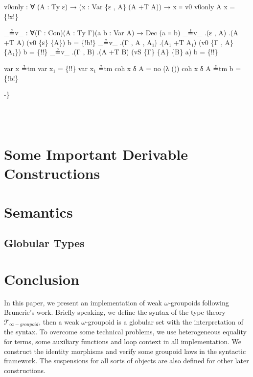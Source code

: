 \documentclass{acm_proc_article-sp}
\newcommand{\wog}{weak $\omega$-groupoids}
\newcommand{\tig}{$\mathcal{T}_{\infty-groupoid}$}
\begin{document}
{\begin{code}
{v0only : ∀ (A : Ty ε) → (x : Var \{ε , A\} (A +T A)) → x ≡ v0
v0only A x = \{!x!\}


\_≟v\_ : ∀(Γ : Con)(A : Ty Γ)(a b : Var A) → Dec (a ≡ b)
\_≟v\_ .(ε , A) .(A +T A) (v0 \{ε\} \{A\}) b = \{!b!\}
\_≟v\_ .(Γ , A , A₁) .(A₁ +T A₁) (v0 \{Γ , A\} \{A₁\}) b = \{!!\}
\_≟v\_ .(Γ , B) .(A +T B) (vS \{Γ\} \{A\} \{B\} a) b = \{!!\}




var x ≟tm var x₁ = \{!!\}
var x₁ ≟tm coh x δ A = no (λ ())
coh x δ A ≟tm b = \{!b!\}

-\}}\<%
\\
%
\\
\>\<\end{code}
}

\section{Some Important Derivable Constructions}









\section{Semantics}

\subsection{Globular Types}








\section{Conclusion}

In this paper, we present an implementation of \wog{} following  Brunerie's work. Briefly speaking, we define the syntax of the type theory \tig{}, then a weak $\omega$-groupoid is a globular set with the interpretation of the syntax. To overcome some technical problems, we use heterogeneous equality for terms, some auxiliary functions and loop context in all implementation. We construct the identity morphisms and verify some groupoid laws in the syntactic framework. The suspensions for all sorts of objects are also defined for other later constructions.
\end{document}
